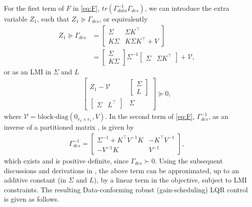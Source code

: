 \documentclass[letterpaper, 10 pt, conference]{ieeeconf}
\newcommand{\trace}{\textit{tr}}
\begin{document}
For the first term of $F$ in \eqref{eq:F}, $\trace \left(\Gamma_{data}^{-1}\Gamma_{des} \right)$, we can introduce the extra variable $Z_1$, such that $Z_1 \succeq \Gamma_{des}$, or equivalently
\begin{align*} 
    Z_1 \succeq \Gamma_{des} &= \begin{bmatrix}
        \Sigma & \Sigma K^\top \\
        K\Sigma & K\Sigma K^\top + V
    \end{bmatrix} \\
    &=
    \begin{bmatrix}
        \Sigma\\
        K \Sigma
    \end{bmatrix} \Sigma^{-1}
    \begin{bmatrix}
        \Sigma & \Sigma K^\top
    \end{bmatrix}+
    \mathcal{V},
\end{align*}
or as an LMI in $\Sigma$ and $L$
\begin{align}\label{eq:Z_1 LMI}
\begin{bmatrix}
        Z_1 - 
        \mathcal{V}
    & \begin{bmatrix}
        \Sigma\\
        L
    \end{bmatrix}\\
    \begin{bmatrix}
        \Sigma & L^\top
    \end{bmatrix} & \Sigma
\end{bmatrix} \succeq 0,
\end{align}
where $\mathcal{V}= \text{block-diag}(0_{r_x \times r_x},V)$. In the second term of \eqref{eq:F}, $\Gamma_{des}^{-1}$, as an inverse of a partitioned matrix \cite{horn2012matrix}, is given by
\begin{align*}
\Gamma_{des}^{-1} = 
\begin{bmatrix}
        \Sigma^{-1}+K^\top V^{-1} K & -K^\top V^{-1} \\
        -V^{-1} K & V^{-1}
\end{bmatrix},
\end{align*}
which exists and is positive definite, since $\Gamma_{des} \succ 0$. Using the subsequent discussions and derivations in \cite{ramadan2024data}, the above term can be approximated, up to an additive constant (in $\Sigma$ and $L$), by a linear term in the objective, subject to LMI constraints. The resulting Data-conforming robust (gain-scheduling) LQR control is given as follows.
\end{document}
